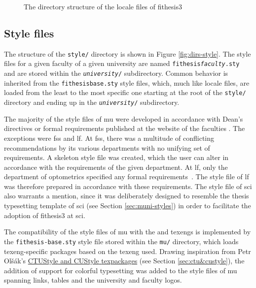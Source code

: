 \documentclass[12pt,twoside,color,table]%
  {fithesis3/fithesis3} %
\begin{document}
  \begin{figure}
    \centering
    \parbox{0.5\textwidth}{}
    \caption{The directory structure of the locale files of
      \textsf{fithesis3}}
    \label{fig:dirs-locale}
  \end{figure}
  
  \subsection{Style files}\label{sec:dev-styles}
  The structure of the \texttt{style/} directory is shown in Figure
  \ref{fig:dirs-style}. The style files for a given faculty of a
  given university are named
  \texttt{fithesis\hyph{}\textit{faculty}.sty} and
  are stored within the \texttt{\textit{university}/}
  subdirectory. Common behavior is inherited from the
  \texttt{fithesis\hyph{}base.sty} style files,
  which, much like locale files, are loaded from the least to the
  most specific one starting at the root of the \texttt{style/}
  directory and ending up in the
  \texttt{\textit{university}/} subdirectory.

  The majority of the style files of \gls{mu} were developed in
  accordance with Dean's directives or formal requirements
  published at the website of the faculties \cite{ffdirective,
  peddirective,scidirective,lawdirective,fidirective,fspsdirective}.
  The exceptions were \gls{fss} and \gls{lf}. At \gls{fss}, there
  was a multitude of conflicting recommendations by its various
  departments with no unifying set of requirements. A skeleton
  style file was created, which the user can alter
  in accordance with the requirements of the given department. At
  \gls{lf}, only the department of optometrics specified any
  formal requirements~\cite{meddirective}. The style file of
  \gls{lf} was therefore prepared in accordance with these
  requirements. The style file of \gls{sci} also warrants a
  mention, since it was deliberately designed to resemble the
  thesis typesetting template of \gls{sci} (see Section
  \ref{sec:muni-styles}) in order to facilitate the adoption of
  \textsf{fithesis3} at \gls{sci}.
  
  The compatibility of the style files of \gls{mu} with the
   and  \glspl{texeng} is implemented
  by the \texttt{fithesis-base.sty} style file stored within the
  \texttt{mu/} directory, which loads \gls{texeng}-specific
  packages based on the \gls{texeng} used. Drawing inspiration
  from Petr Olšák's \hyperref[sec:ctu&custyle]{\textsf{CTUStyle}
   and
  \textsf{CUStyle} \glspl{texpackage}}
  (see Section \ref{sec:ctu&custyle}), the addition of support for
  colorful typesetting was added to the style files of \gls{mu}
  spanning links, tables and the university and faculty logos.
\end{document}
